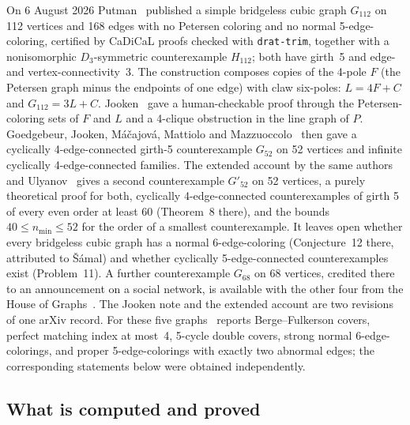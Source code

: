 \documentclass[11pt]{article}
\theoremstyle{definition}
\theoremstyle{remark}
\newcommand{\PG}{P}
\newcommand{\Gmain}{G_{112}}
\newcommand{\Gsym}{H_{112}}
\newcommand{\Gfty}{G_{52}}
\newcommand{\Gftyb}{G'_{52}}
\newcommand{\Gsix}{G_{68}}
\begin{document}
On 6 August 2026 Putman~\cite{Putman2026} published a simple bridgeless cubic graph $\Gmain$ on
112 vertices and 168 edges with no Petersen coloring and no normal 5-edge-coloring, certified by
CaDiCaL proofs checked with \texttt{drat-trim}, together with a nonisomorphic $D_3$-symmetric
counterexample $\Gsym$; both have girth~5 and edge- and vertex-connectivity~3. The construction
composes copies of the 4-pole $F$ (the Petersen graph minus the endpoints of one edge) with claw
six-poles: $L = 4F + C$ and $\Gmain = 3L + C$. Jooken~\cite{GJMMMU2026} gave a human-checkable
proof through the Petersen-coloring sets of $F$ and $L$ and a 4-clique obstruction in the line
graph of $\PG$. Goedgebeur, Jooken, M\'a\v{c}ajov\'a, Mattiolo and Mazzuoccolo~\cite{GJMMM2026}
then gave a cyclically 4-edge-connected girth-5 counterexample $\Gfty$ on 52 vertices and infinite
cyclically 4-edge-connected families. The extended account by the same authors and
Ulyanov~\cite{GJMMMU2026} gives a second counterexample $\Gftyb$ on 52 vertices, a purely
theoretical proof for both, cyclically 4-edge-connected counterexamples of girth 5 of every even
order at least 60 (Theorem~8 there), and the bounds
$40 \le n_{\min} \le 52$ for the order of a smallest counterexample. It leaves open whether every
bridgeless cubic graph has a normal 6-edge-coloring (Conjecture~12 there, attributed to
\v{S}\'amal) and whether cyclically 5-edge-connected counterexamples exist (Problem~11). A further
counterexample $\Gsix$ on 68 vertices, credited there to an announcement on a social network, is
available with the other four from the House of Graphs~\cite{HoG}. The Jooken note and the
extended account are two revisions of one arXiv record. For these five graphs~\cite{GJMMMU2026}
reports Berge--Fulkerson covers, perfect matching index at most~4, 5-cycle double covers, strong
normal 6-edge-colorings, and proper 5-edge-colorings with exactly two abnormal edges; the
corresponding statements below were obtained independently.

\subsection{What is computed and proved}
\end{document}
